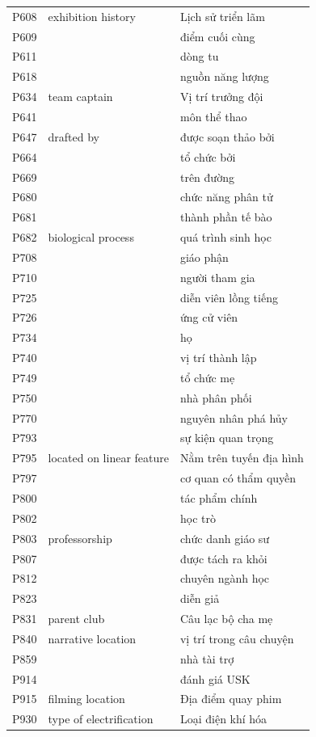 \begin{center}
\begin{longtable}{p{1.6cm} p{5.2cm} p{5.2cm}}
P608 & exhibition history & Lịch sử triển lãm \\
P609 &  & điểm cuối cùng \\
P611 &  & dòng tu \\
P618 &  & nguồn năng lượng \\
P634 & team captain & Vị trí trưởng đội \\
P641 &  & môn thể thao \\
P647 & drafted by & được soạn thảo bởi \\
P664 &  & tổ chức bởi \\
P669 &  & trên đường \\
P680 &  & chức năng phân tử \\
P681 &  & thành phần tế bào \\
P682 & biological process & quá trình sinh học \\
P708 &  & giáo phận \\
P710 &  & người tham gia \\
P725 &  & diễn viên lồng tiếng \\
P726 &  & ứng cử viên \\
P734 &  & họ \\
P740 &  & vị trí thành lập \\
P749 &  & tổ chức mẹ \\
P750 &  & nhà phân phối \\
P770 &  & nguyên nhân phá hủy \\
P793 &  & sự kiện quan trọng \\
P795 & located on linear feature & Nằm trên tuyến địa hình \\
P797 &  & cơ quan có thẩm quyền \\
P800 &  & tác phẩm chính \\
P802 &  & học trò \\
P803 & professorship & chức danh giáo sư \\
P807 &  & được tách ra khỏi \\
P812 &  & chuyên ngành học \\
P823 &  & diễn giả \\
P831 & parent club & Câu lạc bộ cha mẹ \\
P840 & narrative location & vị trí trong câu chuyện \\
P859 &  & nhà tài trợ \\
P914 &  & đánh giá USK \\
P915 & filming location & Địa điểm quay phim \\
P930 & type of electrification & Loại điện khí hóa \\

\end{longtable}
\end{center}
